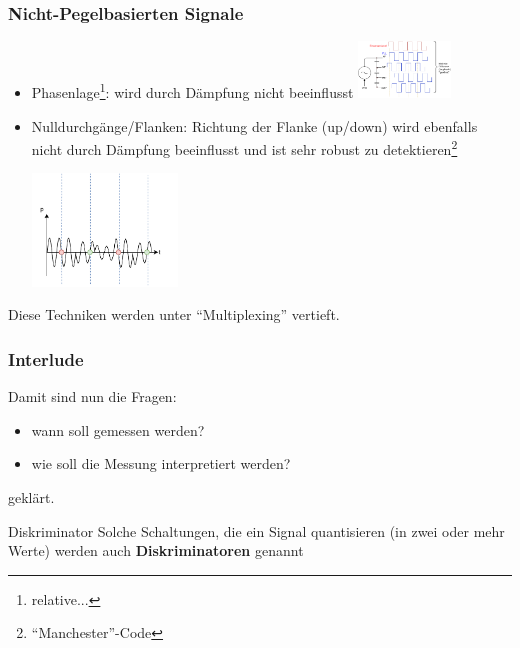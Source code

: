\documentclass[ignorenonframetext]{beamer}
\begin{document}
\begin{frame}
\frametitle{Nicht-Pegelbasierten Signale}
\begin{itemize}
  \item Phasenlage\footnote{relative...}: wird durch D\"ampfung nicht beeinflusst
\includegraphics[height=1.5cm]{asynchron-ethernet}

  \item Nulldurchg\"ange/Flanken: Richtung der Flanke (up/down) wird ebenfalls nicht durch D\"ampfung beeinflusst und ist sehr robust zu detektieren\footnote{``Manchester''-Code}

\includegraphics[height=3cm]{zero-crossing}
\end{itemize}
Diese Techniken werden unter ``Multiplexing'' vertieft.
\end{frame}




\begin{frame}
\frametitle{Interlude}
Damit sind nun die Fragen:

\begin{itemize}
  \item wann soll gemessen werden?
  \item wie soll die Messung interpretiert werden?
\end{itemize}
gekl\"art.

\begin{block}{Diskriminator}
Solche Schaltungen, die ein Signal quantisieren (in zwei oder mehr Werte) werden auch {\bfseries Diskriminatoren} genannt
\end{block}
\end{frame}
\end{document}
